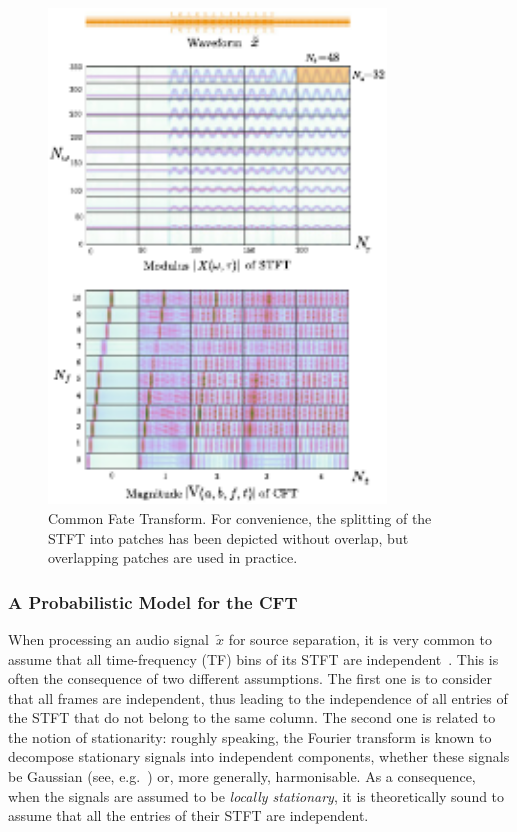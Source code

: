 \begin{figure}[t]
\centering
\includegraphics[width=0.8\textwidth]{Chapters/06_Separation_Unknown/figures/CFT}
\caption{Common Fate Transform. For convenience, the splitting of the STFT
into patches has been depicted without overlap, but overlapping patches are used in practice\label{fig:CFT}.}
\end{figure}

\subsubsection{A Probabilistic Model for the CFT}

\label{ssub:separation}

When processing an audio signal~$\tilde{x}$ for source separation,
it is very common to assume that all time-frequency (TF) bins
of its STFT are independent~\cite{fevotte09, duong10, ozerov12, liutkus11t}.
This is often the consequence of two different assumptions.
The first one is to consider that all frames are independent, thus
leading to the independence of all entries of the STFT that do not belong to the
same column. The second one is related to the notion of stationarity:
roughly speaking, the Fourier transform is known to decompose stationary
signals into independent components, whether these signals be Gaussian
(see, e.g.~\cite{liutkus11t}) or, more generally, harmonisable.
As a consequence, when the signals are assumed to be \emph{locally stationary},
it is theoretically sound to assume that all the entries of
their STFT are independent.

